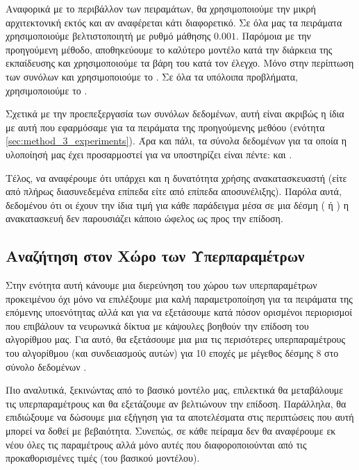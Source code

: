 Αναφορικά με το περιβάλλον των πειραμάτων, θα χρησιμοποιούμε την μικρή αρχιτεκτονική εκτός και αν αναφέρεται κάτι διαφορετικό. Σε όλα μας τα πειράματα χρησιμοποιούμε βελτιστοποιητή  με ρυθμό μάθησης $0.001$. Παρόμοια με την προηγούμενη μέθοδο, αποθηκεύουμε το καλύτερο μοντέλο κατά την διάρκεια της εκπαίδευσης και χρησιμοποιούμε τα βάρη του κατά τον έλεγχο. Μόνο στην περίπτωση των συνόλων  και  χρησιμοποιούμε το . Σε όλα τα υπόλοιπα προβλήματα, χρησιμοποιούμε το .\par

Σχετικά με την προεπεξεργασία των συνόλων δεδομένων, αυτή είναι ακριβώς η ίδια με αυτή που εφαρμόσαμε για τα πειράματα της προηγούμενης μεθόου (ενότητα \ref{sec:method_3_experiments}). Άρα και πάλι, τα σύνολα δεδομένων για τα οποία η υλοποίησή μας έχει προσαρμοστεί για να υποστηρίζει είναι πέντε:  και .\par

Τέλος, να αναφέρουμε ότι υπάρχει και η δυνατότητα χρήσης ανακατασκευαστή (είτε από πλήρως διασυνεδεμένα επίπεδα είτε από επίπεδα αποσυνέλιξης). Παρόλα αυτά, δεδομένου ότι οι  έχουν την ίδια τιμή για κάθε παράδειγμα μέσα σε μια δέσμη ( ή ) η ανακατασκευή δεν παρουσιάζει κάποιο ώφελος ως προς την επίδοση.

\subsection{Αναζήτηση στον Χώρο των Υπερπαραμέτρων}
Στην ενότητα αυτή κάνουμε μια διερεύνηση του χώρου των υπερπαραμέτρων προκειμένου όχι μόνο να επιλέξουμε μια καλή παραμετροποίηση για τα πειράματα της επόμενης υποενότητας αλλά και για να εξετάσουμε κατά πόσον ορισμένοι περιορισμοί που επιβάλουν τα νευρωνικά δίκτυα με κάψουλες βοηθούν την επίδοση του αλγορίθμου μας. Για αυτό, θα εξετάσουμε μια μια τις περισότερες υπερπαραμέτρους του αλγορίθμου (και συνδειασμούς αυτών) για 10 εποχές με μέγεθος δέσμης 8 στο σύνολο δεδομένων .\par

Πιο αναλυτικά, ξεκινώντας από το βασικό  μοντέλο μας, επιλεκτικά θα μεταβάλουμε τις υπερπαραμέτρους και θα εξετάζουμε αν βελτιώνουν την επίδοση. Παράλληλα, θα επιδιώξουμε να δώσουμε μια εξήγηση για τα αποτελέσματα στις περιπτώσεις που αυτή μπορεί να δοθεί με βεβαιότητα. Συνεπώς, σε κάθε πείραμα δεν θα αναφέρουμε εκ νέου όλες τις παραμέτρους αλλά μόνο αυτές που διαφοροποιούνται από τις προκαθορισμένες τιμές (του βασικού μοντέλου).\par

